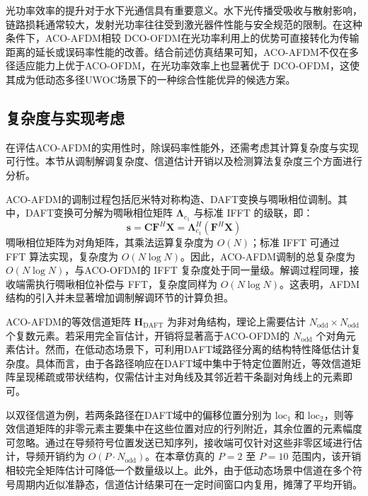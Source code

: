 光功率效率的提升对于水下光通信具有重要意义。水下光传播受吸收与散射影响，链路损耗通常较大，发射光功率往往受到激光器件性能与安全规范的限制。在这种条件下，ACO-AFDM相较 DCO-OFDM在光功率利用上的优势可直接转化为传输距离的延长或误码率性能的改善。结合前述仿真结果可知，ACO-AFDM不仅在多径适应能力上优于ACO-OFDM，在光功率效率上也显著优于 DCO-OFDM，这使其成为低动态多径UWOC场景下的一种综合性能优异的候选方案。

\subsection{复杂度与实现考虑}
\label{subsec:complexity_implementation}

在评估ACO-AFDM的实用性时，除误码率性能外，还需考虑其计算复杂度与实现可行性。本节从调制解调复杂度、信道估计开销以及检测算法复杂度三个方面进行分析。


ACO-AFDM的调制过程包括厄米特对称构造、DAFT变换与啁啾相位调制。其中，DAFT变换可分解为啁啾相位矩阵 $\boldsymbol{\Lambda}_{c_1}$ 与标准 IFFT 的级联，即：
\begin{equation}
\mathbf{s} = \mathbf{C}\mathbf{F}^H \mathbf{X} = \boldsymbol{\Lambda}_{c_1}^H (\mathbf{F}^H \mathbf{X})
\end{equation}
啁啾相位矩阵为对角矩阵，其乘法运算复杂度为 $O(N)$；标准 IFFT 可通过 FFT 算法实现，复杂度为 $O(N\log N)$。因此，ACO-AFDM调制的总复杂度为 $O(N\log N)$，与ACO-OFDM的 IFFT 复杂度处于同一量级。解调过程同理，接收端需执行啁啾相位补偿与 FFT，复杂度同样为 $O(N\log N)$。这表明，AFDM结构的引入并未显著增加调制解调环节的计算负担。


ACO-AFDM的等效信道矩阵 $\mathbf{H}_{\mathrm{DAFT}}$ 为非对角结构，理论上需要估计 $N_{\mathrm{odd}} \times N_{\mathrm{odd}}$ 个复数元素。若采用完全盲估计，开销将显著高于ACO-OFDM的 $N_{\mathrm{odd}}$ 个对角元素估计。然而，在低动态场景下，可利用DAFT域路径分离的结构特性降低估计复杂度。具体而言，由于各路径响应在DAFT域中集中于特定位置附近，等效信道矩阵呈现稀疏或带状结构，仅需估计主对角线及其邻近若干条副对角线上的元素即可。

以双径信道为例，若两条路径在DAFT域中的偏移位置分别为 $\mathrm{loc}_1$ 和 $\mathrm{loc}_2$，则等效信道矩阵的非零元素主要集中在这些位置对应的行列附近，其余位置的元素幅度可忽略。通过在导频符号位置发送已知序列，接收端可仅针对这些非零区域进行估计，导频开销约为 $O(P \cdot N_{\mathrm{odd}})$。在本章仿真的 $P=2$ 至 $P=10$ 范围内，该开销相较完全矩阵估计可降低一个数量级以上。此外，由于低动态场景中信道在多个符号周期内近似准静态，信道估计结果可在一定时间窗口内复用，摊薄了平均开销。


